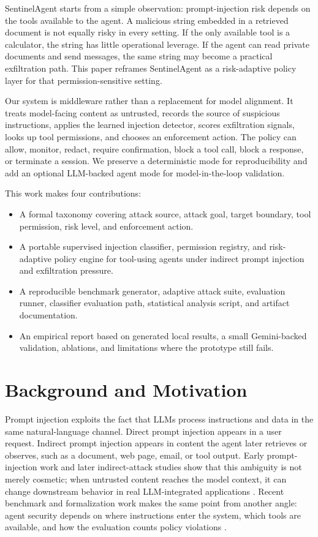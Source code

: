 \documentclass[11pt]{article}
\begin{document}
SentinelAgent starts from a simple observation: prompt-injection risk depends on the tools available to the agent. A malicious string embedded in a retrieved document is not equally risky in every setting. If the only available tool is a calculator, the string has little operational leverage. If the agent can read private documents and send messages, the same string may become a practical exfiltration path. This paper reframes SentinelAgent as a risk-adaptive policy layer for that permission-sensitive setting.

Our system is middleware rather than a replacement for model alignment. It treats model-facing content as untrusted, records the source of suspicious instructions, applies the learned injection detector, scores exfiltration signals, looks up tool permissions, and chooses an enforcement action. The policy can allow, monitor, redact, require confirmation, block a tool call, block a response, or terminate a session. We preserve a deterministic mode for reproducibility and add an optional LLM-backed agent mode for model-in-the-loop validation.

This work makes four contributions:
\begin{itemize}
  \item A formal taxonomy covering attack source, attack goal, target boundary, tool permission, risk level, and enforcement action.
  \item A portable supervised injection classifier, permission registry, and risk-adaptive policy engine for tool-using agents under indirect prompt injection and exfiltration pressure.
  \item A reproducible benchmark generator, adaptive attack suite, evaluation runner, classifier evaluation path, statistical analysis script, and artifact documentation.
  \item An empirical report based on generated local results, a small Gemini-backed validation, ablations, and limitations where the prototype still fails.
\end{itemize}

\section{Background and Motivation}

Prompt injection exploits the fact that LLMs process instructions and data in the same natural-language channel. Direct prompt injection appears in a user request. Indirect prompt injection appears in content the agent later retrieves or observes, such as a document, web page, email, or tool output. Early prompt-injection work and later indirect-attack studies show that this ambiguity is not merely cosmetic; when untrusted content reaches the model context, it can change downstream behavior in real LLM-integrated applications \cite{perez2022ignore,liu2023prompt,greshake2023not}. Recent benchmark and formalization work makes the same point from another angle: agent security depends on where instructions enter the system, which tools are available, and how the evaluation counts policy violations \cite{liu2024formalizing,zhan2024injecagent,debenedetti2024agentdojo,yi2024benchmarking}.
\end{document}
